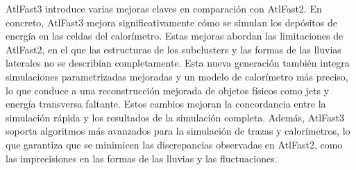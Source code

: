 AtlFast3 introduce varias mejoras claves en comparación con AtlFast2. En concreto, AtlFast3 mejora significativamente cómo se simulan los depósitos de energía en las celdas del calor\'imetro. Estas mejoras abordan las limitaciones de AtlFast2, en el que las estructuras de los subclusters y las formas de las lluvias laterales no se describían completamente. Esta nueva generación también integra simulaciones parametrizadas mejoradas y un modelo de calorímetro más preciso, lo que conduce a una reconstrucción mejorada de objetos físicos como jets y energía transversa faltante. Estos cambios mejoran la concordancia entre la simulación rápida y los resultados de la simulación completa.
Además, AtlFast3 soporta algoritmos más avanzados para la simulación de trazas y calorímetros, lo que garantiza que se minimicen las discrepancias observadas en AtlFast2, como las imprecisiones en las formas de las lluvias y las fluctuaciones.